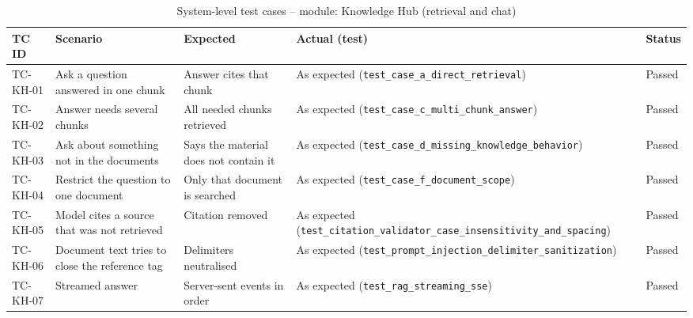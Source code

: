 \begin{table}[!htbp]
\centering
\caption{System-level test cases -- module: Knowledge Hub (retrieval and chat)}\label{tab:tc_hub}
\tcbody
\begin{tabularx}{\textwidth}{@{}l Y Y Y l@{}}
\toprule
\textbf{TC ID} & \textbf{Scenario} & \textbf{Expected} & \textbf{Actual (test)} & \textbf{Status}\\
\midrule
TC-KH-01 & Ask a question answered in one chunk & Answer cites that chunk & As expected (\texttt{test\_case\_a\_direct\_retrieval}) & Passed\\
TC-KH-02 & Answer needs several chunks & All needed chunks retrieved & As expected (\texttt{test\_case\_c\_multi\_chunk\_answer}) & Passed\\
TC-KH-03 & Ask about something not in the documents & Says the material does not contain it & As expected (\texttt{test\_case\_d\_missing\_knowledge\_behavior}) & Passed\\
TC-KH-04 & Restrict the question to one document & Only that document is searched & As expected (\texttt{test\_case\_f\_document\_scope}) & Passed\\
TC-KH-05 & Model cites a source that was not retrieved & Citation removed & As expected (\texttt{test\_citation\_validator\_case\_insensitivity\_and\_spacing}) & Passed\\
TC-KH-06 & Document text tries to close the reference tag & Delimiters neutralised & As expected (\texttt{test\_prompt\_injection\_delimiter\_sanitization}) & Passed\\
TC-KH-07 & Streamed answer & Server-sent events in order & As expected (\texttt{test\_rag\_streaming\_sse}) & Passed\\
\bottomrule
\end{tabularx}
\end{table}


